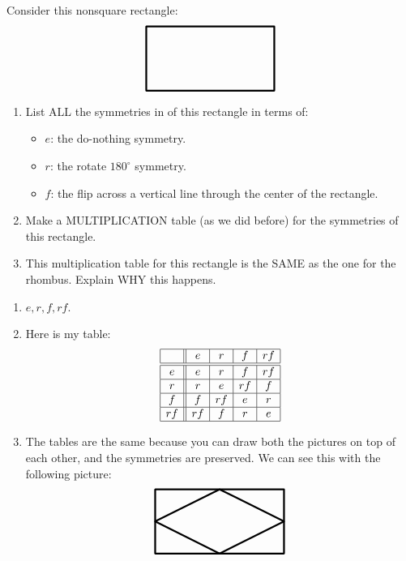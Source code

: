 \documentclass[noauthor,nooutcomes,hints,handout]{ximera}
\begin{document}
\begin{question}
  Consider this nonsquare rectangle:
  \[
  \begin{tikzpicture}
    \draw[ultra thick,rounded corners=.05mm] (0,0) -- (4,0) -- (4,2) -- (0,2)-- cycle;
  \end{tikzpicture}
  \]
  \begin{enumerate}
  \item List ALL the symmetries in of this rectangle in terms of:
    \begin{itemize}
    \item $e$: the do-nothing symmetry.
    \item $r$: the rotate $180^\circ$ symmetry.
    \item $f$: the flip across a vertical line through the center of the rectangle.
    \end{itemize}
  \item Make a MULTIPLICATION table (as we did before) for the
    symmetries of this rectangle.
  \item This multiplication table for this rectangle is the SAME as
    the one for the rhombus. Explain WHY this happens.
  \end{enumerate}
  \begin{freeResponse}
    \begin{enumerate}
    \item $e, r,f,rf$.
    \item Here is my table:
      \[
      \begin{array}{|c||c|c|c|c|c|c|}
    \hline
    & e  & r  & f  & rf \\ \hline\hline
    e  & e  & r  & f  & rf \\ \hline
    r  & r  & e  & rf & f \\ \hline
    f  & f  & rf & e  & r \\ \hline
    rf & rf & f  & r  & e \\ \hline
      \end{array}
      \]
      \item The tables are the same because you can draw both the
        pictures on top of each other, and the symmetries are
        preserved. We can see this with the following picture:
     \[
  \begin{tikzpicture}
    \draw[ultra thick,rounded corners=.05mm] (0,0) -- (4,0) -- (4,2) -- (0,2)-- cycle; %
    \draw[ultra thick,rounded corners=.05mm] (0,1) -- (2,0) -- (4,1) -- (2,2)-- cycle; %
  \end{tikzpicture}
  \]    
    \end{enumerate}
  \end{freeResponse}
\end{question}
\end{document}

